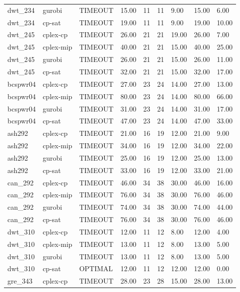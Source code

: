 \begin{tabular}{lllllllll}
dwt\_234 & gurobi & TIMEOUT & 15.00 & 11 & 11 & 9.00 & 15.00 & 6.00 \\
dwt\_234 & cp-sat & TIMEOUT & 19.00 & 11 & 11 & 9.00 & 19.00 & 10.00 \\
dwt\_245 & cplex-cp & TIMEOUT & 26.00 & 21 & 21 & 19.00 & 26.00 & 7.00 \\
dwt\_245 & cplex-mip & TIMEOUT & 40.00 & 21 & 21 & 15.00 & 40.00 & 25.00 \\
dwt\_245 & gurobi & TIMEOUT & 26.00 & 21 & 21 & 15.00 & 26.00 & 11.00 \\
dwt\_245 & cp-sat & TIMEOUT & 32.00 & 21 & 21 & 15.00 & 32.00 & 17.00 \\
bcspwr04 & cplex-cp & TIMEOUT & 27.00 & 23 & 24 & 14.00 & 27.00 & 13.00 \\
bcspwr04 & cplex-mip & TIMEOUT & 80.00 & 23 & 24 & 14.00 & 80.00 & 66.00 \\
bcspwr04 & gurobi & TIMEOUT & 31.00 & 23 & 24 & 14.00 & 31.00 & 17.00 \\
bcspwr04 & cp-sat & TIMEOUT & 47.00 & 23 & 24 & 14.00 & 47.00 & 33.00 \\
ash292 & cplex-cp & TIMEOUT & 21.00 & 16 & 19 & 12.00 & 21.00 & 9.00 \\
ash292 & cplex-mip & TIMEOUT & 34.00 & 16 & 19 & 12.00 & 34.00 & 22.00 \\
ash292 & gurobi & TIMEOUT & 25.00 & 16 & 19 & 12.00 & 25.00 & 13.00 \\
ash292 & cp-sat & TIMEOUT & 33.00 & 16 & 19 & 12.00 & 33.00 & 21.00 \\
can\_292 & cplex-cp & TIMEOUT & 46.00 & 34 & 38 & 30.00 & 46.00 & 16.00 \\
can\_292 & cplex-mip & TIMEOUT & 76.00 & 34 & 38 & 30.00 & 76.00 & 46.00 \\
can\_292 & gurobi & TIMEOUT & 74.00 & 34 & 38 & 30.00 & 74.00 & 44.00 \\
can\_292 & cp-sat & TIMEOUT & 76.00 & 34 & 38 & 30.00 & 76.00 & 46.00 \\
dwt\_310 & cplex-cp & TIMEOUT & 12.00 & 11 & 12 & 8.00 & 12.00 & 4.00 \\
dwt\_310 & cplex-mip & TIMEOUT & 13.00 & 11 & 12 & 8.00 & 13.00 & 5.00 \\
dwt\_310 & gurobi & TIMEOUT & 13.00 & 11 & 12 & 8.00 & 13.00 & 5.00 \\
dwt\_310 & cp-sat & OPTIMAL & 12.00 & 11 & 12 & 12.00 & 12.00 & 0.00 \\
gre\_343 & cplex-cp & TIMEOUT & 28.00 & 23 & 28 & 15.00 & 28.00 & 13.00 \\

\end{tabular}
